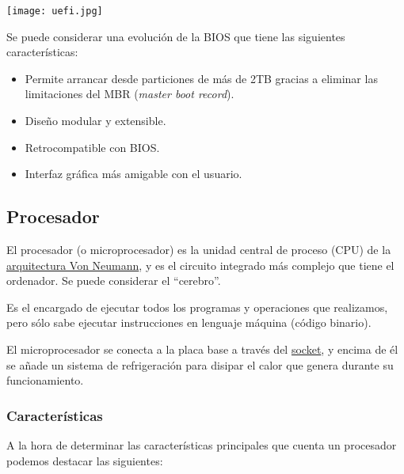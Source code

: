 \begin{center}
    \texttt{[image: uefi.jpg]}
\end{center}

Se puede considerar una evolución de la BIOS  que tiene las siguientes características:

\begin{itemize}
    \item Permite arrancar desde particiones de más de 2TB gracias a eliminar las limitaciones del MBR (\textit{master boot record}).
    \item Diseño modular y extensible.
    \item Retrocompatible con BIOS.
    \item Interfaz gráfica más amigable con el usuario.
\end{itemize}


\subsection{Procesador}
El procesador (o microprocesador) es la unidad central de proceso (CPU) de la \hyperlink{von_neumann}{arquitectura Von Neumann}, y es el  circuito integrado más complejo que tiene el ordenador. Se puede considerar el “cerebro”.

Es el encargado de ejecutar todos los programas y operaciones que realizamos, pero sólo sabe ejecutar instrucciones en lenguaje máquina (código binario).

El microprocesador se conecta a la placa base a través del \hyperlink{socket}{socket}, y encima de él se añade un sistema de refrigeración para disipar el calor que genera durante su funcionamiento.


\subsubsection{Características}
A la hora de determinar las características principales que cuenta un procesador podemos destacar las siguientes:

